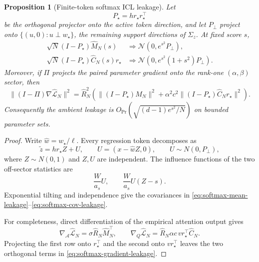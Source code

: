 \documentclass[11pt]{article}
\newtheorem{proposition}[theorem]{Proposition}
\begin{document}
\begin{proposition}[Finite-token softmax ICL leakage]
\label{prop:softmax-leakage}
Let
\[
P_\star=hr_\star r_\star^\top
\]
be the orthogonal projector onto the active token direction, and let
\(P_\perp\) project onto
\(\{(u,0):u\perp w_\star\}\), the remaining support directions of
\(\Sigma_z\).  At fixed score \(s\),
\begin{align}
\sqrt N(I-P_\star)\widehat M_N(s)
&\Rightarrow
\mathcal N\!\left(0,e^{s^2}P_\perp\right),\label{eq:softmax-mean-leakage}\\
\sqrt N(I-P_\star)\widehat C_N(s)r_\star
&\Rightarrow
\mathcal N\!\left(0,e^{s^2}(1+s^2)P_\perp\right).
\label{eq:softmax-cov-leakage}
\end{align}
Moreover, if \(\Pi\) projects the paired parameter gradient onto the
rank-one \((\alpha,\beta)\) sector, then
\begin{equation}
\label{eq:softmax-gradient-leakage}
\|(I-\Pi)\nabla\widehat{\mathcal L}_N\|^2
=
\widehat R_N^2
\left(
\|(I-P_\star)\widehat M_N\|^2
+\alpha^2c^2\|(I-P_\star)\widehat C_Nr_\star\|^2
\right).
\end{equation}
Consequently the ambient leakage is
\(O_{\Pr}(\sqrt{(d-1)e^{s^2}/N})\) on bounded parameter sets.
\end{proposition}

\begin{proof}
Write \(\widehat w=w_\star/\ell\).  Every regression token decomposes as
\[
\widetilde z=hr_\star Z+U,\qquad
U=(x-\widehat wZ,0),\qquad
U\sim N(0,P_\perp),
\]
where \(Z\sim N(0,1)\) and \(Z,U\) are independent.  The influence
functions of the two off-sector statistics are
\[
\frac{W}{a_s}U,\qquad
\frac{W}{a_s}U(Z-s).
\]
Exponential tilting and independence give the covariances in
\eqref{eq:softmax-mean-leakage}--\eqref{eq:softmax-cov-leakage}.

For completeness, direct differentiation of the empirical attention output
gives
\[
\nabla_{\mathcal A}\widehat{\mathcal L}_N
=\sigma\widehat R_N\widehat M_N^\top,\qquad
\nabla_Q\widehat{\mathcal L}_N
=\widehat R_N\alpha c\,v r_\star^\top\widehat C_N.
\]
Projecting the first row onto \(r_\star^\top\) and the second onto
\(vr_\star^\top\) leaves the two orthogonal terms in
\eqref{eq:softmax-gradient-leakage}.
\end{proof}
\end{document}
